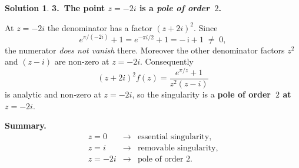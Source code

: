 \documentclass[12pt]{article}
\theoremstyle{definition} %
\newtheorem{solution}{Solution}
\theoremstyle{plain} %
\begin{document}
\begin{solution}
            \bigskip
            \textbf{3.\ The point $z=-2i$ is a \emph{pole of order $2$}.}
            
            At $z=-2i$ the denominator has a factor $(z+2i)^{2}$.
            Since
            \[
               e^{\pi/(-2i)}+1
               =e^{-\pi i/2}+1
               =-\,\mathrm{i}+1
               \;\neq\;0,
            \]
            the numerator \emph{does not vanish} there.
            Moreover the other denominator factors $z^{2}$ and $(z-i)$ are non‑zero
            at $z=-2i$.
            Consequently
            \[
               (z+2i)^{2}f(z)
               =\frac{e^{\pi/z}+1}{z^{2}(z-i)}
            \]
            is analytic and non‑zero at $z=-2i$, so the singularity is a
            \textbf{pole of order $2$ at $z=-2i$}.
            
            \bigskip
            \textbf{Summary.}\;  
            \[
               \boxed{\;
                  \begin{array}{lcl}
                     z=0     &\longrightarrow& \text{essential singularity},\\[2pt]
                     z=i     &\longrightarrow& \text{removable singularity},\\[2pt]
                     z=-2i   &\longrightarrow& \text{pole of order }2.
                  \end{array}
               \;}
            \]
            \end{solution}
\end{document}

